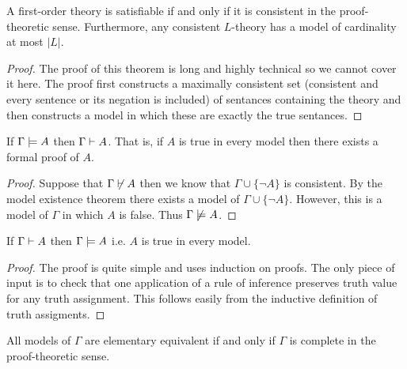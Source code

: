 \documentclass[12pt]{article}
\begin{document}
\begin{theorem}
A first-order theory is satisfiable if and only if it is consistent in the proof-theoretic sense. Furthermore, any consistent $L$-theory has a model of cardinality at most $|L|$. 
\end{theorem}

\begin{proof}
The proof of this theorem is long and highly technical so we cannot cover it here. The proof first constructs a maximally consistent set (consistent and every sentence or its negation is included) of sentances containing the theory and then constructs a model in which these are exactly the true sentances.   
\end{proof}

\begin{theorem}[Adequacy]
If $\Gamma \models A$ then $\Gamma \vdash A$. That is, if $A$ is true in every model then there exists a formal proof of $A$.
\end{theorem}

\begin{proof}
Suppose that $\Gamma \not\vdash A$ then we know that $\Gamma \cup \{\neg A\}$ is consistent. By the model existence theorem there exists a model of $\Gamma \cup \{ \neg A \}$. However, this is a model of $\Gamma$ in which $A$ is false. Thus $\Gamma \not\models A$.  
\end{proof}

\begin{theorem}[Soundness]
If $\Gamma \vdash A$ then $\Gamma \models A$ i.e. $A$ is true in every model.
\end{theorem}

\begin{proof}
The proof is quite simple and uses induction on proofs. The only piece of input is to check that one application of a rule of inference preserves truth value for any truth assignment. This follows easily from the inductive definition of truth assigments. 
\end{proof}

\begin{theorem}
All models of $\Gamma$ are elementary equivalent if and only if $\Gamma$ is complete in the proof-theoretic sense. 
\end{theorem}
\end{document}
